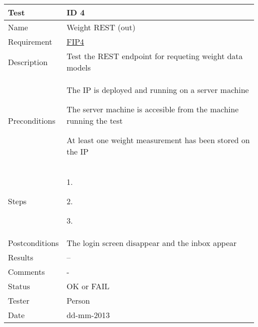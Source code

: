 \begin{table}
\begin{center}
\begin{tabular}{ | l | p{10cm} | }
	\hline
	\textbf{Test}	&	\textbf{ID 4} \\
	\hline\noalign{\smallskip}\noalign{\smallskip}\hline
	Name				& Weight REST (out) \\
	Requirement			& \hyperref[table:reqip]{FIP4} \\
	Description			& Test the REST endpoint for requeting weight data models \\
	Preconditions		&	\par The IP is deployed and running on a server machine
							\par The server machine is accesible from the machine running the test
							\par At least one weight measurement has been stored on the IP \\
	Steps 				&	\par 1. 
							\par 2. 
							\par 3.  \\
	Postconditions		& The login screen disappear and the inbox appear \\
	Results				& -- \\
	Comments			& - \\
	Status				& OK or FAIL \\
	Tester				& Person \\
	Date				& dd-mm-2013 \\
	\hline
\end{tabular}
\end{center}
\end{table}


